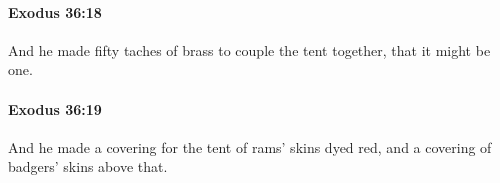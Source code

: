 		\paragraph{Exodus 36:18} %
			\label{EXODUS-36-18}

			And he made fifty taches of brass to couple the tent together, that it might be one.


		\paragraph{Exodus 36:19} %
			\label{EXODUS-36-19}

			And he made a covering for the tent of rams' skins dyed red, and a covering of badgers' skins above that.


